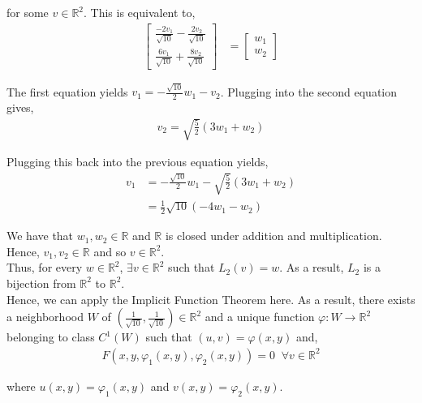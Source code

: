 \documentclass[12pt]{article}
\begin{document}
for some $v \in \mathbb{R}^2$. This is equivalent to,
\begin{align*}
\begin{bmatrix}
\frac{-2v_1}{\sqrt{10}} - \frac{2v_2}{\sqrt{10}}\\
\frac{6v_1}{\sqrt{10}} + \frac{8v_2}{\sqrt{10}}
\end{bmatrix} &= \begin{bmatrix}
w_1 \\ w_2
\end{bmatrix}
\end{align*}

The first equation yields $v_1 = -\frac{\sqrt{10}}{2}w_1 - v_2$. Plugging into the second equation gives,
\begin{align*}
v_2 = \sqrt{\frac{5}{2}} (3w_1 + w_2)
\end{align*}

Plugging this back into the previous equation yields,
\begin{align*}
v_1 &= -\frac{\sqrt{10}}{2} w_1 - \sqrt{\frac{5}{2}} (3w_1 + w_2)\\
&= \frac{1}{2} \sqrt{10} (-4w_1 - w_2)
\end{align*}

We have that $w_1, w_2 \in \mathbb{R}$ and $\mathbb{R}$ is closed under addition and multiplication. Hence, $v_1, v_2 \in \mathbb{R}$ and so $v \in \mathbb{R}^2$.\\

Thus, for every $w \in \mathbb{R}^2$, $\exists v \in \mathbb{R}^2$ such that $L_2(v) = w$. As a result, $L_2$ is a bijection from $\mathbb{R}^2$ to $\mathbb{R}^2$.\\

Hence, we can apply the Implicit Function Theorem here. As a result, there exists a neighborhood $W$ of $\left(\frac{1}{\sqrt{10}}, \frac{1}{\sqrt{10}}\right) \in \mathbb{R}^2$ and a unique function $\varphi: W \to \mathbb{R}^2$ belonging to class $C^1(W)$ such that $(u, v) = \varphi(x, y)$ and,
\begin{align*}
F(x, y, \varphi_1(x, y), \varphi_2(x, y)) = 0 \; \; \forall v \in \mathbb{R}^2
\end{align*}

where $u(x, y) = \varphi_1(x,y)$ and $v(x, y) = \varphi_2(x, y)$.\\
\end{document}
